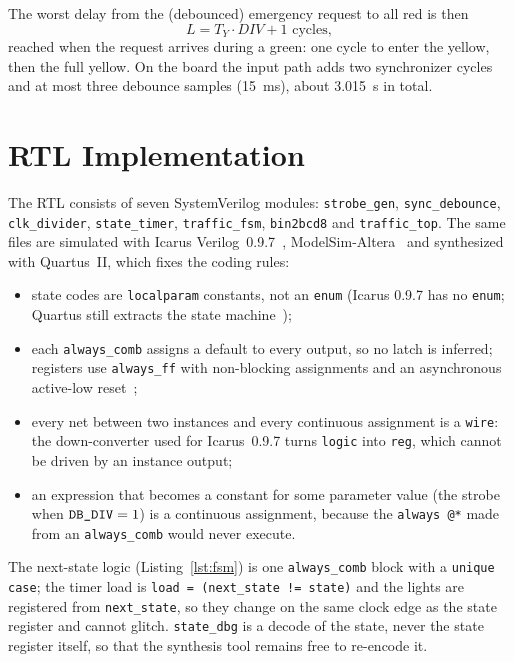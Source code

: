 \documentclass[conference]{IEEEtran}
\newcommand{\code}[1]{\texttt{\upshape #1}}
\begin{document}
The worst delay from the (debounced) emergency request to all red is then
\begin{equation}
L = T_Y\cdot\mathit{DIV} + 1 \text{ cycles},
\label{eq:lat}
\end{equation}
reached when the request arrives during a green: one cycle to enter the yellow,
then the full yellow. On the board the input path adds two synchronizer cycles and
at most three debounce samples (15~ms), about 3.015~s in total.

\section{RTL Implementation}\label{sec:rtl}

The RTL consists of seven SystemVerilog modules: \code{strobe\_gen},
\code{sync\_debounce}, \code{clk\_divider}, \code{state\_timer},
\code{traffic\_fsm}, \code{bin2bcd8} and \code{traffic\_top}. The same files are
simulated with Icarus Verilog~0.9.7~\cite{icarus}, ModelSim-Altera~\MsimVersion{}
and synthesized with Quartus~II, which fixes the coding rules:
\begin{itemize}
\item state codes are \code{localparam} constants, not an \code{enum} (Icarus
      0.9.7 has no \code{enum}; Quartus still extracts the state
      machine~\cite{quartus13});
\item each \code{always\_comb} assigns a default to every output, so no latch is
      inferred; registers use \code{always\_ff} with non-blocking assignments and
      an asynchronous active-low reset~\cite{cummings03};
\item every net between two instances and every continuous assignment is a
      \code{wire}: the down-converter used for Icarus~0.9.7 turns \code{logic}
      into \code{reg}, which cannot be driven by an instance output;
\item an expression that becomes a constant for some parameter value (the strobe
      when $\code{DB\_DIV}=1$) is a continuous assignment, because the
      \code{always @*} made from an \code{always\_comb} would never execute.
\end{itemize}

The next-state logic (Listing~\ref{lst:fsm}) is one \code{always\_comb} block with
a \code{unique case}; the timer load is \code{load = (next\_state != state)} and
the lights are registered from \code{next\_state}, so they change on the same
clock edge as the state register and cannot glitch. \code{state\_dbg} is a decode
of the state, never the state register itself, so that the synthesis tool remains
free to re-encode it.
\end{document}
